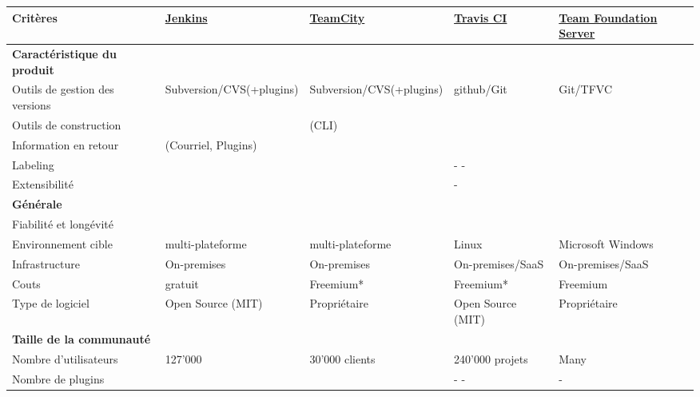 \newpage
\begin{landscape}
\begin{table}[H]
	\centering
		\begin{tabular}{lp{4cm}p{4cm}p{4cm}p{4cm}} \toprule
			\textbf{Critères} & \href{https://jenkins-ci.org}{\textbf{Jenkins}} & \href{https://www.jetbrains.com/teamcity/}{\textbf{TeamCity}} & \href{https://travis-ci.org}{\textbf{Travis CI}} & \href{https://www.visualstudio.com/en-us/products/tfs-overview-vs.aspx}{\textbf{Team Foundation Server}} \\ \midrule
			\rowcolor{GrayRow}\textbf{Caractéristique du produit} &  &  &  &  \\ \midrule[0.16em]
			Outils de gestion des versions & Subversion/CVS(+plugins) & Subversion/CVS(+plugins) & github/Git & Git/TFVC \\ \midrule
			Outils de construction &  \checkmark & \checkmark\checkmark (CLI) & \checkmark & \checkmark \\ \midrule
			Information en retour & \checkmark (Courriel, Plugins) & \checkmark & \checkmark\checkmark & \checkmark\checkmark \\ \midrule
			Labeling &  \checkmark\checkmark & \checkmark & - - &\checkmark\checkmark \\ \midrule
			Extensibilité & \checkmark\checkmark & \checkmark & - & \checkmark \\ \midrule
			\rowcolor{GrayRow}\textbf{Générale} &  &  &  &  \\ \midrule[0.16em]
			Fiabilité et longévité & \checkmark\checkmark & \checkmark\checkmark & \checkmark\checkmark & \checkmark\checkmark \\ \midrule
			Environnement cible & multi-plateforme & multi-plateforme & Linux & Microsoft Windows \\ \midrule
			Infrastructure & On-premises & On-premises & On-premises/SaaS & On-premises/SaaS \\ \midrule
			Couts & gratuit & Freemium* & Freemium* & Freemium \\ \midrule
			Type de logiciel & Open Source (MIT) & Propriétaire & Open Source (MIT) & Propriétaire \\ \midrule
			\rowcolor{GrayRow}\textbf{Taille de la communauté} & & & & \\ \midrule[0.16em]
			Nombre d'utilisateurs & 127'000 & 30'000 clients & 240'000 projets & Many \\ \midrule
			Nombre de plugins & \checkmark\checkmark & \checkmark & - - & - \\ \midrule

\end{tabular}
\end{table}
\end{landscape}

